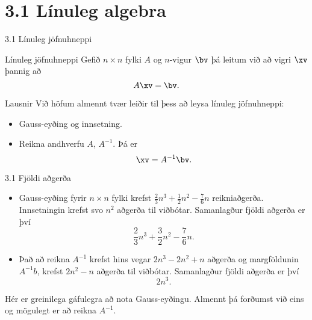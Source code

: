 \section*{3.1 Línuleg algebra}
\begin{frame}{3.1 Línuleg jöfnuhneppi}
\begin{block}{Línuleg jöfnuhneppi}
 Gefið $n\times n$ fylki $A$ og $n$-vigur $\bv$ þá leitum við að
vigri $\xv$ þannig að 
$$
A\xv = \bv.
$$
\end{block}

\pause 

 \begin{block}{Lausnir}
  Við höfum almennt tvær leiðir til þess að leysa línuleg jöfnuhneppi: \pause
\begin{itemize}
 \item Gauss-eyðing og innsetning.\pause
\item Reikna andhverfu $A$, $A^{-1}$. Þá er 
$$ 
\xv = A^{-1}\bv.
$$
\end{itemize}
\end{block}
\end{frame}

\begin{frame}{3.1 Fjöldi aðgerða}
 \begin{block}{}
  \begin{itemize}
   \item Gauss-eyðing fyrir $n\times n$ fylki krefst $\frac 23n^3+\frac 12n^2 -\frac 76n$
reikniaðgerða. Innsetningin krefst svo $n^2$ aðgerða til viðbótar. 
\pause  Samanlagður fjöldi aðgerða er því
$$
\frac 23n^3+\frac 32n^2 -\frac 76n.
$$\pause
  \item Það að reikna $A^{-1}$ krefst hins vegar $2n^3-2n^2+n$ aðgerða og margföldunin 
$A^{-1}b$, krefst $2n^2-n$ aðgerða til viðbótar. 
\pause Samanlagður fjöldi aðgerða er því
$$
2n^3.
$$\pause
  \end{itemize}
Hér er greinilega gáfulegra að nota Gauss-eyðingu. Almennt
þá forðumst við eins og mögulegt er að reikna $A^{-1}$.
 \end{block}

\end{frame}

